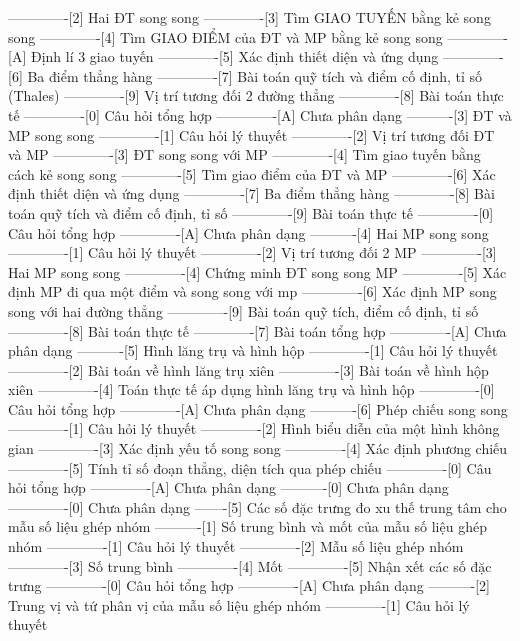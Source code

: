 -------------[2] Hai ĐT song song
-------------[3] Tìm GIAO TUYẾN bằng kẻ song song
-------------[4] Tìm GIAO ĐIỂM của ĐT và MP bằng kẻ song song
-------------[A] Định lí 3 giao tuyến
-------------[5] Xác định thiết diện và ứng dụng
-------------[6] Ba điểm thẳng hàng
-------------[7] Bài toán quỹ tích và điểm cố định, tỉ số (Thales)
-------------[9] Vị trí tương đối 2 đường thẳng
-------------[8] Bài toán thực tế
-------------[0] Câu hỏi tổng hợp
-------------[A] Chưa phân dạng
----------[3] ĐT và MP song song
-------------[1] Câu hỏi lý thuyết
-------------[2] Vị trí tương đối ĐT và MP
-------------[3] ĐT song song với MP
-------------[4] Tìm giao tuyến bằng cách kẻ song song
-------------[5] Tìm giao điểm của ĐT và MP
-------------[6] Xác định thiết diện và ứng dụng
-------------[7] Ba điểm thẳng hàng
-------------[8] Bài toán quỹ tích và điểm cố định, tỉ số
-------------[9] Bài toán thực tế
-------------[0] Câu hỏi tổng hợp
-------------[A] Chưa phân dạng
----------[4] Hai MP song song
-------------[1] Câu hỏi lý thuyết
-------------[2] Vị trí tương đối 2 MP
-------------[3] Hai MP song song
-------------[4] Chứng minh ĐT song song MP
-------------[5] Xác định MP đi qua một điểm và song song với mp
-------------[6] Xác định MP song song với hai đường thẳng
-------------[9] Bài toán quỹ tích, điểm cố định, tỉ số 
-------------[8] Bài toán thực tế
-------------[7] Bài toán tổng hợp
-------------[A] Chưa phân dạng
----------[5] Hình lăng trụ và hình hộp
-------------[1] Câu hỏi lý thuyết
-------------[2] Bài toán về hình lăng trụ xiên
-------------[3] Bài toán về hình hộp xiên
-------------[4] Toán thực tế áp dụng hình lăng trụ và hình hộp
-------------[0] Câu hỏi tổng hợp
-------------[A] Chưa phân dạng
----------[6] Phép chiếu song song
-------------[1] Câu hỏi lý thuyết
-------------[2] Hình biểu diễn của một hình không gian
-------------[3] Xác định yếu tố song song
-------------[4] Xác định phương chiếu
-------------[5] Tính tỉ số đoạn thẳng, diện tích qua phép chiếu
-------------[0] Câu hỏi tổng hợp
-------------[A] Chưa phân dạng
----------[0] Chưa phân dạng
-------------[0] Chưa phân dạng
-------[5] Các số đặc trưng đo xu thế trung tâm cho mẫu số liệu ghép nhóm
----------[1] Số trung bình và mốt của mẫu số liệu ghép nhóm
-------------[1] Câu hỏi lý thuyết
-------------[2] Mẫu số liệu ghép nhóm
-------------[3] Số trung bình
-------------[4] Mốt
-------------[5] Nhận xết các số đặc trưng
-------------[0] Câu hỏi tổng hợp
-------------[A] Chưa phân dạng
----------[2] Trung vị và tứ phân vị của mẫu số liệu ghép nhóm
-------------[1] Câu hỏi lý thuyết
